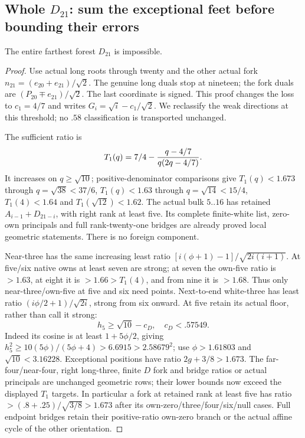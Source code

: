 \subsection{Whole $D_{21}$: sum the exceptional feet before bounding their errors}
\label{app:tail:wholeD21}
\begin{proposition}
\label{app:tail:prop:wholeD21}
The entire farthest forest $D_{21}$ is impossible.
\end{proposition}
\begin{proof}
Use actual long roots through twenty and the other actual fork
$n_{21}=(e_{20}+e_{21})/\sqrt2$. The genuine long duals stop at
nineteen; the fork duals are $(P_{20}\mathbin\mp e_{21})/\sqrt2$.
The last coordinate is signed. This proof changes the loss to
$c_1=4/7$ and writes $G_i=\sqrt i-c_1/\sqrt2$.
We reclassify the weak directions at this threshold; no $.58$
classification is transported unchanged.

The sufficient ratio is
\[
 T_1(q)=7/4-{q-4/7\over q(2q-4/7)}.
\]
It increases on $q\ge\sqrt{10}$; positive-denominator comparisons
give $T_1(q)<1.673$ through $q=\sqrt{38}<37/6$,
$T_1(q)<1.63$ through $q=\sqrt{14}<15/4$,
$T_1(4)<1.64$ and $T_1(\sqrt{12})<1.62$.
The actual bulk $5..16$ has retained $A_{i-1}+D_{21-i}$, with
right rank at least five. Its complete finite-white list, zero-own
principals and full rank-twenty-one bridges are already proved
local geometric statements. There is no foreign component.

Near-three has the same increasing least ratio
$[i(\phi+1)-1]/\sqrt{2i(i+1)}$. At five/six native owns at least
seven are strong; at seven the own-five ratio is $>1.63$, at
eight it is $>1.66>T_1(4)$, and from nine it is $>1.68$.
Thus only near-three/own-five at five and six need points.
Next-to-end white-three has least ratio $(i\phi/2+1)/\sqrt{2i}$,
strong from six onward. At five retain its actual floor, rather
than call it strong:
\[
 h_5\ge\sqrt{10}-c_D,\quad c_D<.57549.
\]
Indeed its cosine is at least $1+5\phi/2$, giving
$h_5^2\ge10(5\phi)/(5\phi+4)>6.6915>2.58679^2$;
use $\phi>1.61803$ and $\sqrt{10}<3.16228$.
Exceptional positions have ratio $2g+3/8>1.673$.
The far-four/near-four, right long-three, finite $D$ fork and
bridge ratios or actual principals are unchanged geometric rows;
their lower bounds now exceed the displayed $T_1$ targets. In
particular a fork at retained rank at least five has ratio
$>(.8+.25)/\sqrt{3/8}>1.673$ after its own-zero/three/four/six/null
cases. Full endpoint bridges retain their positive-ratio own-zero
branch or the actual affine cycle of the other orientation.


\end{proof}
